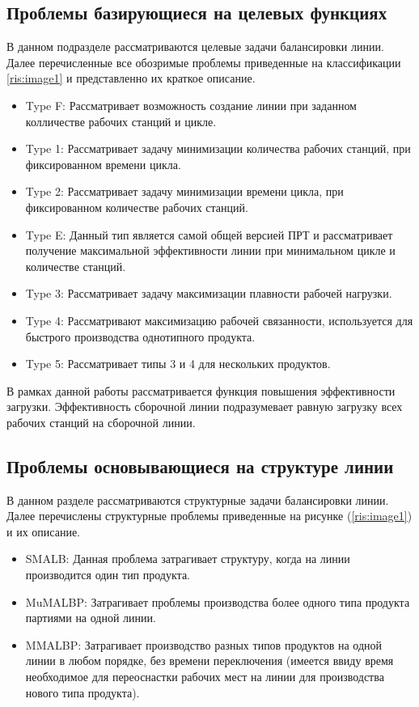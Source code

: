 \subsection{Проблемы базирующиеся на целевых функциях}
В данном подразделе рассматриваются целевые задачи балансировки линии. Далее перечисленные все обозримые проблемы приведенные на классификации \ref{ris:image1} и представленно их краткое описание.
\begin{itemize}
    \item Type F: Рассматривает возможность создание линии при заданном колличестве рабочих станций и цикле.
    \item Type 1: Рассматривает задачу минимизации количества рабочих станций, при фиксированном времени цикла.
    \item Type 2: Рассматривает задачу минимизации времени цикла, при фиксированном количестве рабочих станций.
    \item Type E: Данный тип является самой общей версией ПРТ и рассматривает получение максимальной эффективности линии при минимальном цикле и количестве станций.
    \item Type 3: Рассматривает задачу максимизации плавности рабочей нагрузки.
    \item Type 4: Рассматривают максимизацию рабочей связанности, используется для быстрого производства однотипного продукта.
    \item Type 5: Рассматривает типы 3 и 4 для нескольких продуктов.
\end{itemize}

В рамках данной работы рассматривается функция повышения эффективности загрузки. Эффективность сборочной линии подразумевает равную загрузку всех рабочих станций на сборочной линии. 

\subsection{Проблемы основывающиеся на структуре линии}
В данном разделе рассматриваются структурные задачи балансировки линии. Далее перечислены структурные проблемы приведенные на рисунке (\ref{ris:image1}) и их описание.

\begin{itemize}
    \item SMALB: Данная проблема затрагивает структуру, когда на линии производится один тип продукта.
    \item MuMALBP: Затрагивает проблемы производства более одного типа продукта партиями на одной линии.
    \item MMALBP: Затрагивает производство разных типов продуктов на одной линии в любом порядке, без времени переключения (имеется ввиду время необходимое для переоснастки рабочих мест на линии для производства нового типа продукта).
\end{itemize}

